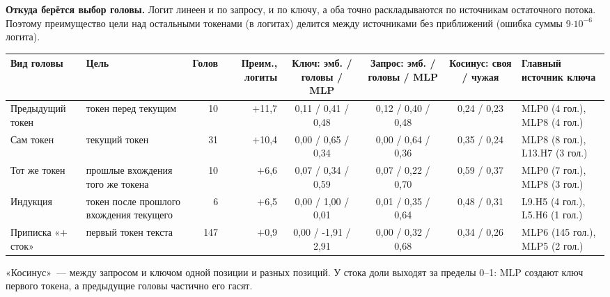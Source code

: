 \documentclass[10pt]{article}
\begin{document}
\noindent\begin{minipage}{\linewidth}
\textbf{Откуда берётся выбор головы.} Логит линеен и по запросу, и по ключу, а оба точно раскладываются по источникам остаточного потока. Поэтому преимущество цели над остальными токенами (в логитах) делится между источниками без приближений (ошибка суммы 9$\cdot 10^{-6}$ логита).
\begin{center}{\small\begin{tabular}{|l|p{3.7cm}|r|r|c|c|c|p{3.5cm}|}\hline
\rowcolor{head}\textbf{Вид головы} & \textbf{Цель} & \textbf{Голов} & \textbf{Преим., логиты} & \textbf{Ключ: эмб. / головы / MLP} & \textbf{Запрос: эмб. / головы / MLP} & \textbf{Косинус: своя / чужая} & \textbf{Главный источник ключа} \\ \hline
Предыдущий токен & токен перед текущим & 10 & $+$11,7 & 0,11 / 0,41 / 0,48 & 0,12 / 0,40 / 0,48 & 0,24 / 0,23 & MLP0 (4 гол.), MLP8 (4 гол.) \\ \hline
Сам токен & текущий токен & 31 & $+$10,4 & 0,00 / 0,65 / 0,34 & 0,00 / 0,64 / 0,36 & 0,35 / 0,24 & MLP8 (8 гол.), L13.H7 (3 гол.) \\ \hline
Тот же токен & прошлые вхождения того же токена & 10 & $+$6,6 & 0,07 / 0,34 / 0,59 & 0,07 / 0,22 / 0,70 & 0,59 / 0,37 & MLP0 (7 гол.), MLP8 (3 гол.) \\ \hline
Индукция & токен после прошлого вхождения текущего & 6 & $+$6,5 & 0,00 / 1,00 / 0,01 & 0,01 / 0,35 / 0,64 & 0,48 / 0,31 & L9.H5 (4 гол.), L5.H6 (1 гол.) \\ \hline
Приписка «+ сток» & первый токен текста & 147 & $+$0,9 & 0,00 / -1,91 / 2,91 & 0,00 / 0,32 / 0,68 & 0,34 / 0,26 & MLP6 (145 гол.), MLP5 (2 гол.) \\ \hline
\hline\end{tabular}}\end{center}
«Косинус»~— между запросом и ключом одной позиции и разных позиций. У стока доли выходят за пределы 0–1: MLP создают ключ первого токена, а предыдущие головы частично его гасят.
\end{minipage}
\par
\end{document}
